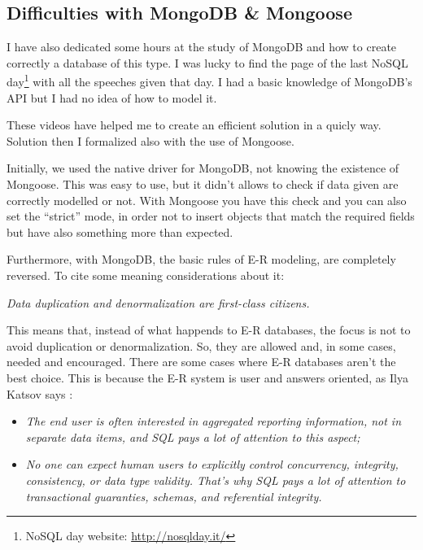 \subsection{Difficulties with MongoDB \& Mongoose}
I have also dedicated some hours at the study of MongoDB and how to create correctly a database of this type. I was lucky to find the page of the last NoSQL day\footnote{NoSQL day website: \url{http://nosqlday.it/}} with all the speeches given that day. I had a basic knowledge of MongoDB's API but I had no idea of how to model it.

These videos have helped me to create an efficient solution in a quicly way. Solution then I formalized also with the use of Mongoose.

Initially, we used the native driver for MongoDB, not knowing the existence of Mongoose. This was easy to use, but it didn't allows to check if data given are correctly modelled or not. With Mongoose you have this check and you can also set the ``strict'' mode, in order not to insert objects that match the required fields but have also something more than expected.

Furthermore, with MongoDB, the basic rules of E-R modeling, are completely reversed. To cite some meaning considerations about it:

\begin{center}
	\textit{Data duplication and denormalization are first-class citizens.}\cite{website:nosqldatamodeling}
\end{center}

This means that, instead of what happends to E-R databases, the focus is not to avoid duplication or denormalization. So, they are allowed and, in some cases, needed and encouraged. There are some cases where E-R databases aren't the best choice. This is because the E-R system is user and answers oriented, as Ilya Katsov says \cite{website:nosqldatamodeling}:

\begin{itemize}
\item \textit{The end user is often interested in aggregated reporting information, not in separate data items, and SQL pays a lot of attention to this aspect;}
\item \textit{No one can expect human users to explicitly control concurrency, integrity, consistency, or data type validity. That’s why SQL pays a lot of attention to transactional guaranties, schemas, and referential integrity.}
\end{itemize}


